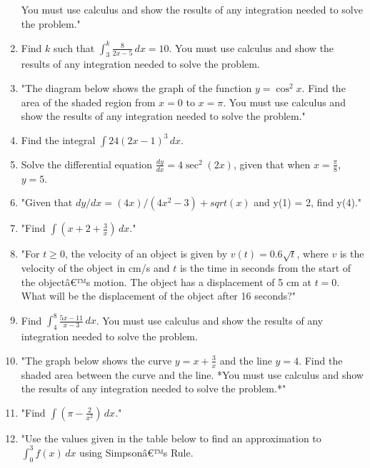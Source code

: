 \documentclass{article}
\begin{document}
\begin{enumerate}
You must use calculus and show the results of any integration needed to solve the problem."
\vspace{3cm}
\item Find \( k \) such that \(\int_{3}^{k} \frac{8}{2x-5} \, dx = 10\). You must use calculus and show the results of any integration needed to solve the problem.
\vspace{3cm}
\item "The diagram below shows the graph of the function \( y = \cos^2 x \). Find the area of the shaded region from \( x = 0 \) to \( x = \pi \). You must use calculus and show the results of any integration needed to solve the problem."
\vspace{3cm}
\item Find the integral \(\int 24(2x-1)^3 \, dx\).
\vspace{3cm}
\item Solve the differential equation \( \frac{dy}{dx} = 4 \sec^2(2x) \), given that when \( x = \frac{\pi}{8} \), \( y = 5 \).
\vspace{3cm}
\item "Given that \(dy/dx = (4x)/(4x^2 - 3) + sqrt(x)\) and y(1) = 2, find y(4)."
\vspace{3cm}
\item "Find \(\int \left( x + 2 + \frac{3}{x} \right) \, dx\)."
\vspace{3cm}
\item "For \(t \geq 0\), the velocity of an object is given by \(v(t) = 0.6 \sqrt{t}\), where \(v\) is the velocity of the object in cm/s and \(t\) is the time in seconds from the start of the objectâ€™s motion. The object has a displacement of 5 cm at \(t = 0\). What will be the displacement of the object after 16 seconds?"
\vspace{3cm}
\item Find \(\int_{4}^{8} \frac{5x - 11}{x - 3} \, dx\). You must use calculus and show the results of any integration needed to solve the problem.
\vspace{3cm}
\item "The graph below shows the curve \( y = x + \frac{3}{x} \) and the line \( y = 4 \). Find the shaded area between the curve and the line. *You must use calculus and show the results of any integration needed to solve the problem.*"
\vspace{3cm}
\item "Find \(\int \left( \pi - \frac{2}{x^2} \right) \, dx\)."
\vspace{3cm}
\item "Use the values given in the table below to find an approximation to \(\int_0^3 f(x) \, dx\) using Simpsonâ€™s Rule.


\end{enumerate}
\end{document}
